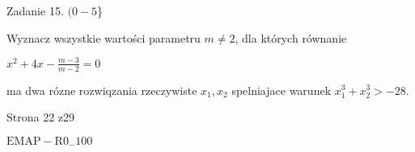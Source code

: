 \documentclass[a4paper,12pt]{article}
\begin{document}
Zadanie 15. $(0-5$\}

Wyznacz wszystkie wartości parametru $m\neq 2$, dla których równanie

$x^{2}+4x-\displaystyle \frac{m-3}{m-2}=0$

ma dwa rózne rozwiqzania rzeczywiste $x_{1}, x_{2}$ spelniajace warunek $x_{1}^{3}+x_{2}^{3}>-28.$

Strona 22 z29

$\mathrm{E}\mathrm{M}\mathrm{A}\mathrm{P}-\mathrm{R}0_{-}100$
\end{document}
